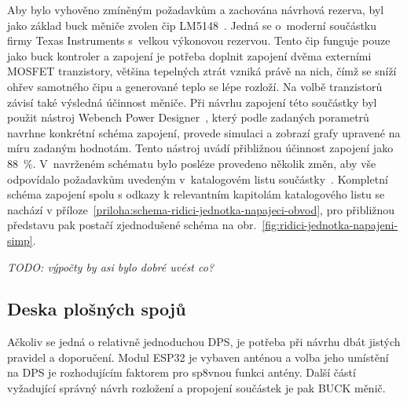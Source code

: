         
        Aby bylo vyhověno zmíněným požadavkům a zachována návrhová rezerva, byl jako základ buck měniče zvolen čip LM5148~\cite{lm5148-datasheet}. Jedná se o~moderní součástku firmy Texas Instruments s~velkou výkonovou rezervou. Tento čip funguje pouze jako buck kontroler a zapojení je potřeba doplnit zapojení dvěma externími MOSFET tranzistory, většina tepelných ztrát vzniká právě na nich, čímž se sníží ohřev samotného čipu a generované teplo se lépe rozloží. Na volbě tranzistorů závisí také výsledná účinnost měniče. Při návrhu zapojení této součástky byl použit nástroj Webench Power Designer~\cite{webench-power-designer}, který podle zadaných porametrů navrhne konkrétní schéma zapojení, provede simulaci a zobrazí grafy upravené na míru zadaným hodnotám. Tento nástroj uvádí přibližnou účinnost zapojení jako \qty{88}{\percent}. V~navrženém schématu bylo posléze provedeno několik změn, aby vše odpovídalo požadavkům uvedeným v~katalogovém listu součástky~\cite{lm5148-datasheet}. Kompletní schéma zapojení spolu s odkazy k relevantním kapitolám katalogového listu se nachází v příloze~\ref{priloha:schema-ridici-jednotka-napajeci-obvod}, pro přibližnou představu pak postačí zjednodušené schéma na obr.~\ref{fig:ridici-jednotka-napajeni-simp}. 

        \textit{TODO: výpočty by asi bylo dobré uvést co?}

    \subsection{Deska plošných spojů}
        Ačkoliv se jedná o relativně jednoduchou DPS, je potřeba při návrhu dbát jistých pravidel a doporučení. Modul ESP32 je vybaven anténou a volba jeho umístění na DPS je rozhodujícím faktorem pro sp8vnou funkci antény. Další částí vyžadující správný návrh rozložení a propojení součástek je pak BUCK měnič. 
        
